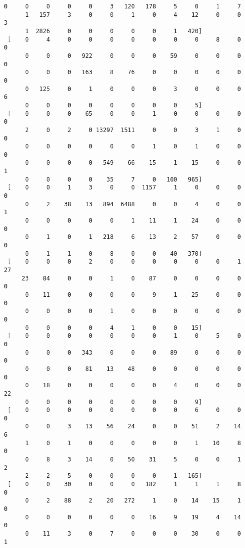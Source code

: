 \documentclass[11pt]{article}
\begin{document}
\begin{Verbatim}[commandchars=\\\{\}]
      0     0     0     0     0     3   120   178     5     0     1     7
      1   157     3     0     0     1     0     4    12     0     0     3
      1  2826     0     0     0     0     0     1   420]
 [    0     4     0     0     0     0     0     0     0     8     0     0
      0     0     0   922     0     0     0    59     0     0     0     0
      0     0     0   163     8    76     0     0     0     0     0     0
      0   125     0     1     0     0     0     3     0     0     0     6
      0     0     0     0     0     0     0     0     5]
 [    0     0     0    65     0     0     1     0     0     0     0     0
      2     0     2     0 13297  1511     0     0     3     1     0     0
      0     0     0     0     0     0     1     0     1     0     0     0
      0     0     0     0   549    66    15     1    15     0     0     1
      0     0     0     0    35     7     0   100   965]
 [    0     0     1     3     0     0  1157     1     0     0     0     0
      0     2    38    13   894  6488     0     0     4     0     0     1
      0     0     0     0     0     1    11     1    24     0     0     0
      0     1     0     1   218     6    13     2    57     0     0     0
      0     1     1     0     8     0     0    40   370]
 [    0     0     0     2     0     0     0     0     0     0     1    27
     23    84     0     0     1     0    87     0     0     0     0     0
      0    11     0     0     0     0     9     1    25     0     0     0
      0     0     0     0     1     0     0     0     0     0     0     0
      0     0     0     0     4     1     0     0    15]
 [    0     0     0     0     0     0     0     1     0     5     0     0
      0     0     0   343     0     0     0    89     0     0     0     0
      0     0     0    81    13    48     0     0     0     0     0     0
      0    18     0     0     0     0     0     4     0     0     0    22
      0     0     0     0     0     0     0     0     9]
 [    0     0     0     0     0     0     0     0     6     0     0     0
      0     0     3    13    56    24     0     0    51     2    14     6
      1     0     1     0     0     0     0     0     1    10     8     0
      0     8     3    14     0    50    31     5     0     0     1     2
      2     2     5     0     0     0     0     1   165]
 [    0     0    30     0     0     0   182     1     1     1     8     0
      0     2    88     2    20   272     1     0    14    15     1     0
      0     0     0     0     0     0    16     9    19     4    14     0
      0    11     3     0     7     0     0     0    30     0     0     1

\end{Verbatim}
\end{document}
